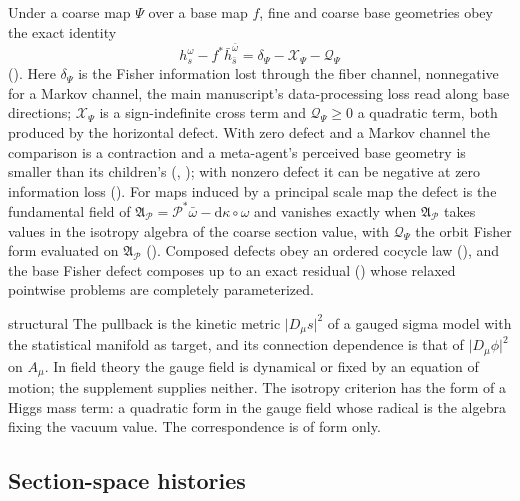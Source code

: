 Under a coarse map \(\Psi\) over a base map \(f\), fine and coarse base geometries obey the exact identity
\[
h^\omega_s-f^*\bar h^{\bar\omega}_{\bar s}=\delta_\Psi-\mathcal X_\Psi-\mathcal Q_\Psi
\]
(). Here \(\delta_\Psi\) is the Fisher information lost through the fiber
channel, nonnegative for a Markov channel, the main manuscript's data-processing loss read along base
directions; \(\mathcal X_\Psi\) is a sign-indefinite cross term and \(\mathcal Q_\Psi\geq0\) a quadratic
term, both produced by the horizontal defect. With zero defect and a Markov channel the comparison is a
contraction and a
meta-agent's perceived base geometry is smaller than its children's
(, ); with nonzero defect it can be
negative at zero information loss (). For maps induced by a principal
scale map the defect is the fundamental field of
\(\mathfrak A_{\mathcal P}=\mathcal P^*\bar\omega-\mathrm d\kappa\circ\omega\) and vanishes exactly when
\(\mathfrak A_{\mathcal P}\) takes values in the isotropy algebra of the coarse section value, with
\(\mathcal Q_\Psi\) the orbit Fisher form evaluated on \(\mathfrak A_{\mathcal P}\)
(). Composed defects obey an ordered cocycle law
(), and the base Fisher defect composes up to an exact residual
() whose relaxed pointwise problems are completely parameterized.

\begin{analogy}{structural}
The pullback is the kinetic metric \(\lvert D_\mu s\rvert^2\) of a gauged sigma model with the statistical
manifold as target, and its connection dependence is that of \(\lvert D_\mu\phi\rvert^2\) on \(A_\mu\). In
field theory the gauge field is dynamical or fixed by an equation of motion; the supplement supplies
neither. The isotropy criterion has the form of a Higgs mass term: a quadratic form in the gauge field
whose radical is the algebra fixing the vacuum value. The correspondence is of form only.
\end{analogy}

\subsection{Section-space histories}
\label{comp:sb-histories}

